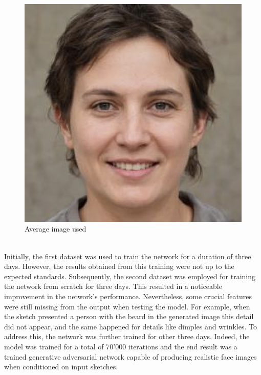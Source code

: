 \begin{figure}[htbp]
\centering
  \includegraphics[scale=0.2]{figures/avg_image.png}
  \caption{Average image used}
  \label{fig:Average image}
\end{figure}
\\
Initially, the first dataset was used to train the network for a duration of three days. However, the results obtained from this training were not up to the expected standards. Subsequently, the second dataset was employed for training the network from scratch for three days. This resulted in a noticeable improvement in the network's performance. Nevertheless, some crucial features were still missing from the output when testing the model. For example, when the sketch presented a person with the beard in the generated image this detail did not appear, and the same happened for details like dimples and wrinkles. To address this, the network was further trained for other three days. Indeed, the model was trained for a total of 70'000 iterations and the end result was a trained generative adversarial network capable of producing realistic face images when conditioned on input sketches.\\
